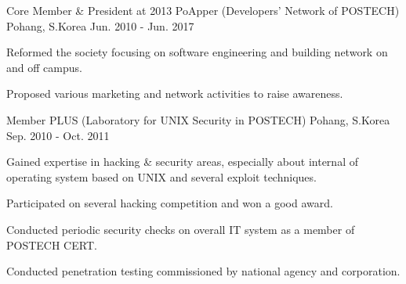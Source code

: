 

\begin{cventries}

  \cventry
    {Core Member \& President at 2013} %
    {PoApper (Developers' Network of POSTECH)} %
    {Pohang, S.Korea} %
    {Jun. 2010 - Jun. 2017} %
    {
      \begin{cvitems} %
        \item {Reformed the society focusing on software engineering and building network on and off campus.}
        \item {Proposed various marketing and network activities to raise awareness.}
      \end{cvitems}
    }

  \cventry
    {Member} %
    {PLUS (Laboratory for UNIX Security in POSTECH)} %
    {Pohang, S.Korea} %
    {Sep. 2010 - Oct. 2011} %
    {
      \begin{cvitems} %
        \item {Gained expertise in hacking \& security areas, especially about internal of operating system based on UNIX and several exploit techniques.}
        \item {Participated on several hacking competition and won a good award.}
        \item {Conducted periodic security checks on overall IT system as a member of POSTECH CERT.}
        \item {Conducted penetration testing commissioned by national agency and corporation.}
      \end{cvitems}
    }

\end{cventries}

